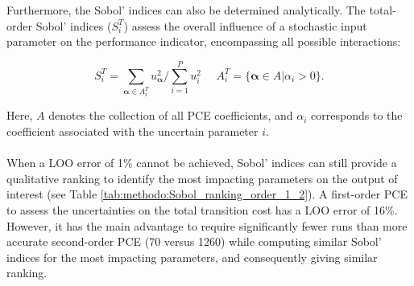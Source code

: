Furthermore, the Sobol' indices can also be determined analytically. The total-order Sobol' indices ($S_i^{T}$) assess the overall influence of a stochastic input parameter on the performance indicator, encompassing all possible interactions:

\begin{equation}
S_i^{T} = \sum_{\bm{\alpha} \in A_i^T}^{} u_{\bm{\alpha}}^2/\sum_{i=1}^P u_i^2 ~~~~~~ A_i^T = \{\bm{\alpha} \in A | \alpha_i > 0\}.
\end{equation}

Here, $A$ denotes the collection of all PCE coefficients, and $\alpha_i$ corresponds to the coefficient associated with the uncertain parameter $i$.\\

\\

When a \gls{LOO} error of 1\% cannot be achieved, Sobol' indices can still provide a qualitative ranking to identify the most impacting parameters on the output of interest (see Table \ref{tab:methodo:Sobol_ranking_order_1_2}). A first-order \gls{PCE} to assess the uncertainties on the total transition cost has a \gls{LOO} error of 16\%. However, it has the main advantage to require significantly fewer runs than more accurate second-order \gls{PCE} (70 versus 1260) while computing similar Sobol' indices for the most impacting parameters, and consequently giving similar ranking.

\begin{table}[htbp!]
\caption{Total Sobol' indices of the uncertain parameters over the total transition cost via \gls{PCE} of orders 2 and 1 having a \gls{LOO} error of 1\% and 16\%, respectively. The similar rankings (and indices) show the validity of using the faster (even though less accurate) lower order \gls{PCE} to rank the most impacting uncertain parameters.}
\label{tab:methodo:Sobol_ranking_order_1_2}
\begin{minipage}{\textwidth}
\centering
{}
\end{minipage}
\end{table}

